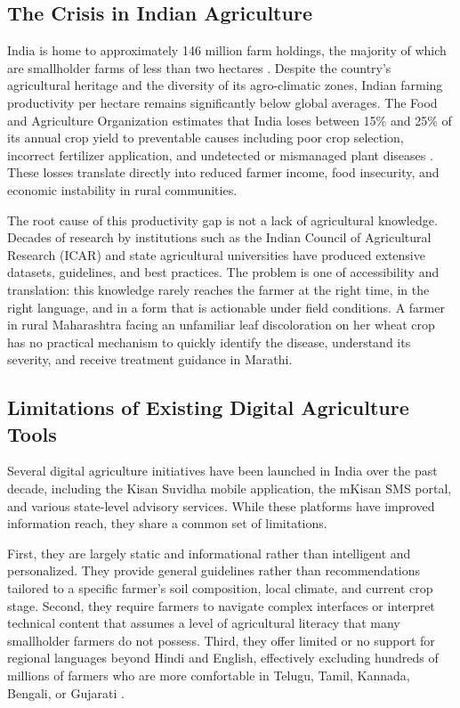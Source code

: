 \documentclass[conference]{IEEEtran}
\begin{document}
\subsection{The Crisis in Indian Agriculture}

India is home to approximately 146 million farm holdings, the majority of which are smallholder farms of less than two hectares \cite{fao2022}. Despite the country's agricultural heritage and the diversity of its agro-climatic zones, Indian farming productivity per hectare remains significantly below global averages. The Food and Agriculture Organization estimates that India loses between 15\% and 25\% of its annual crop yield to preventable causes including poor crop selection, incorrect fertilizer application, and undetected or mismanaged plant diseases \cite{worldbank2020}. These losses translate directly into reduced farmer income, food insecurity, and economic instability in rural communities.

The root cause of this productivity gap is not a lack of agricultural knowledge. Decades of research by institutions such as the Indian Council of Agricultural Research (ICAR) and state agricultural universities have produced extensive datasets, guidelines, and best practices. The problem is one of accessibility and translation: this knowledge rarely reaches the farmer at the right time, in the right language, and in a form that is actionable under field conditions. A farmer in rural Maharashtra facing an unfamiliar leaf discoloration on her wheat crop has no practical mechanism to quickly identify the disease, understand its severity, and receive treatment guidance in Marathi.

\subsection{Limitations of Existing Digital Agriculture Tools}

Several digital agriculture initiatives have been launched in India over the past decade, including the Kisan Suvidha mobile application, the mKisan SMS portal, and various state-level advisory services. While these platforms have improved information reach, they share a common set of limitations.

First, they are largely static and informational rather than intelligent and personalized. They provide general guidelines rather than recommendations tailored to a specific farmer's soil composition, local climate, and current crop stage. Second, they require farmers to navigate complex interfaces or interpret technical content that assumes a level of agricultural literacy that many smallholder farmers do not possess. Third, they offer limited or no support for regional languages beyond Hindi and English, effectively excluding hundreds of millions of farmers who are more comfortable in Telugu, Tamil, Kannada, Bengali, or Gujarati \cite{census2011}.
\end{document}
